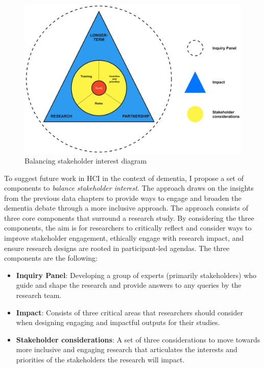 \begin{figure}[htp]
\centering
\includegraphics[width=0.8\linewidth]{Images/Discussion/DesignApproach.jpg}
\caption{Balancing stakeholder interest diagram}
\label{fig:MeaningfulParticipation}
\end{figure}
To suggest future work in HCI in the context of dementia, I propose a set of components to \textit{balance stakeholder interest}. The approach draws on the insights from the previous data chapters to provide ways to engage and broaden the dementia debate through a more inclusive approach. The approach consists of three core components that surround a research study. By considering the three components, the aim is for researchers to critically reflect and consider ways to improve stakeholder engagement, ethically engage with research impact, and ensure research designs are rooted in participant-led agendas. The three components are the following:

\begin{itemize}
    \item \textbf{Inquiry Panel}: Developing a group of experts (primarily stakeholders) who guide and shape the research and provide answers to any queries by the research team.
    \item \textbf{Impact}: Consists of three critical areas that researchers should consider when designing engaging and impactful outputs for their studies.
    \item \textbf{Stakeholder considerations}: A set of three considerations to move towards more inclusive and engaging research that articulates the interests and priorities of the stakeholders the research will impact.
\end{itemize}

